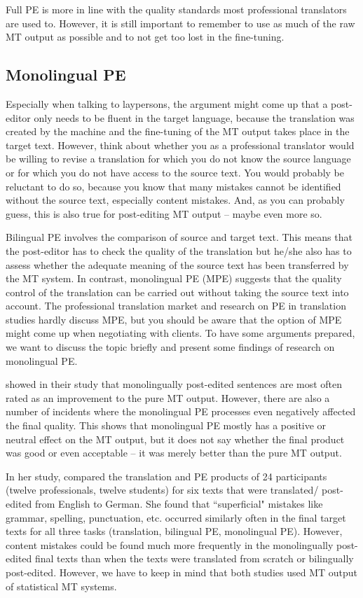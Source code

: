 Full PE is more in line with the quality standards most professional translators are used to. However, it is still important to remember to use as much of the raw MT output as possible and to not get too lost in the fine-tuning.

\subsection{Monolingual PE}\label{sec:4:1:3}

Especially when talking to laypersons, the argument might come up that a post-editor only needs to be fluent in the target language, because the translation was created by the machine and the fine-tuning of the MT output takes place in the target text. However, think about whether you as a professional translator would be willing to revise a translation for which you do not know the source language or for which you do not have access to the source text. You would probably be reluctant to do so, because you know that many mistakes cannot be identified without the source text, especially content mistakes. And, as you can probably guess, this is also true for post-editing MT output -- maybe even more so.

Bilingual PE involves the comparison of source and target text. This means that the post-editor has to check the quality of the translation but he/she also has to assess whether the adequate meaning of the source text has been transferred by the MT system. In contrast, monolingual PE (MPE) suggests that the quality control of the translation can be carried out without taking the source text into account. The professional translation market and research on PE in translation studies hardly discuss MPE, but you should be aware that the option of MPE might come up when negotiating with clients. To have some arguments prepared, we want to discuss the topic briefly and present some findings of research on monolingual PE.

\citet{mitchell2013community} showed in their study that monolingually post-edited sentences are most often rated as an improvement to the pure MT output. However, there are also a number of incidents where the monolingual PE processes even negatively affected the final quality. This shows that monolingual PE mostly has a positive or neutral effect on the MT output, but it does not say whether the final product was good or even acceptable -- it was merely better than the pure MT output.

In her study, \citet{nitzke2016monolingual} compared the translation and PE products of 24 participants (twelve professionals, twelve students) for six texts that were translated/ post-edited from English to German. She found that ``superficial" mistakes like grammar, spelling, punctuation, etc. occurred similarly often in the final target texts for all three tasks (translation, bilingual PE, monolingual PE). However, content mistakes could be found much more frequently in the monolingually post-edited final texts than when the texts were translated from scratch or bilingually post-edited. However, we have to keep in mind that both studies used MT output of statistical MT systems.

